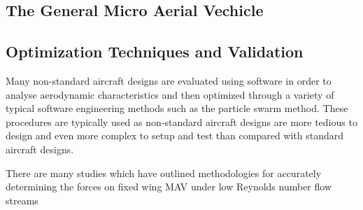 \subsection{The General Micro Aerial Vechicle}
\label{subsec:GenMAV}

\subsection{Optimization Techniques and Validation}
\label{subsec:Optimization}
Many non-standard aircraft designs are evaluated using software in order to analyse aerodynamic characteristics and then optimized through a variety of typical software engineering methods such as the particle swarm method. These procedures are typically used as non-standard aircraft designs are more tedious to design and even more complex to setup and test than compared with standard aircraft designs. 

There are many studies which have outlined methodologies for accurately determining the forces on fixed wing MAV under low Reynolds number flow streams \cite{Roberts2011} 




